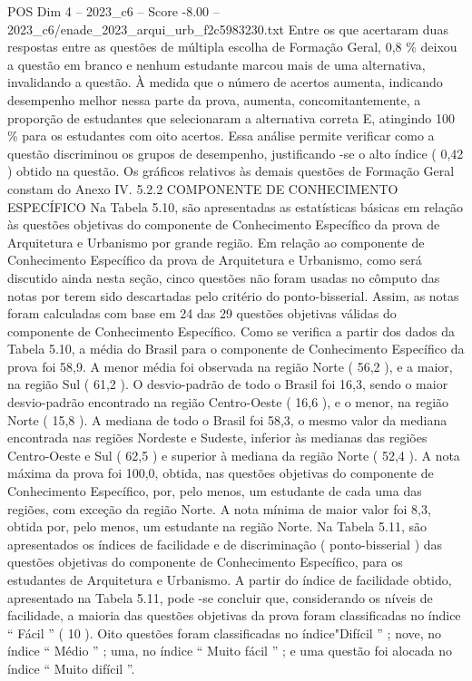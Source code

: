 \begin{textsample}{POS Dim 4 – 2023\_c6 – Score -8.00 – 2023\_c6/enade\_2023\_arqui\_urb\_f2c5983230.txt}
Entre os que acertaram duas respostas entre as questões de múltipla escolha de Formação Geral, 0,8 \% deixou a questão em branco e nenhum estudante marcou mais de uma alternativa, invalidando a questão.
À medida que o número de acertos aumenta, indicando desempenho melhor nessa parte da prova, aumenta, concomitantemente, a proporção de estudantes que selecionaram a alternativa correta E, atingindo 100 \% para os estudantes com oito acertos.
Essa análise permite verificar como a questão discriminou os grupos de desempenho, justificando -se o alto índice ( 0,42 ) obtido na questão.
Os gráficos relativos às demais questões de Formação Geral constam do Anexo IV. 5.2.2 COMPONENTE DE CONHECIMENTO ESPECÍFICO Na Tabela 5.10, são apresentadas as estatísticas básicas em relação às questões objetivas do componente de Conhecimento Específico da prova de Arquitetura e Urbanismo por grande região.
Em relação ao componente de Conhecimento Específico da prova de Arquitetura e Urbanismo, como será discutido ainda nesta seção, cinco questões não foram usadas no cômputo das notas por terem sido descartadas pelo critério do ponto-bisserial.
Assim, as notas foram calculadas com base em 24 das 29 questões objetivas válidas do componente de Conhecimento Específico.
Como se verifica a partir dos dados da Tabela 5.10, a média do Brasil para o componente de Conhecimento Específico da prova foi 58,9.
A menor média foi observada na região Norte ( 56,2 ), e a maior, na região Sul ( 61,2 ).
O desvio-padrão de todo o Brasil foi 16,3, sendo o maior desvio-padrão encontrado na região Centro-Oeste ( 16,6 ), e o menor, na região Norte ( 15,8 ).
A mediana de todo o Brasil foi 58,3, o mesmo valor da mediana encontrada nas regiões Nordeste e Sudeste, inferior às medianas das regiões Centro-Oeste e Sul ( 62,5 ) e superior à mediana da região Norte ( 52,4 ).
A nota máxima da prova foi 100,0, obtida, nas questões objetivas do componente de Conhecimento Específico, por, pelo menos, um estudante de cada uma das regiões, com exceção da região Norte.
A nota mínima de maior valor foi 8,3, obtida por, pelo menos, um estudante na região Norte.
Na Tabela 5.11, são apresentados os índices de facilidade e de discriminação ( ponto-bisserial ) das questões objetivas do componente de Conhecimento Específico, para os estudantes de Arquitetura e Urbanismo.
A partir do índice de facilidade obtido, apresentado na Tabela 5.11, pode -se concluir que, considerando os níveis de facilidade, a maioria das questões objetivas da prova foram classificadas no índice “ Fácil ” ( 10 ).
Oito questões foram classificadas no índice"Difícil ” ; nove, no índice “ Médio ” ; uma, no índice “ Muito fácil ” ; e uma questão foi alocada no índice “ Muito difícil ”.

\end{textsample}
